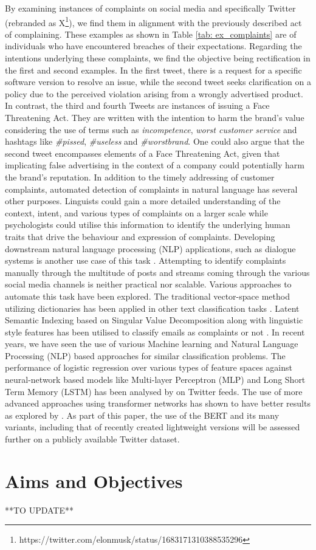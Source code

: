 By examining instances of complaints on social media and specifically Twitter (rebranded as X\footnote{https://twitter.com/elonmusk/status/1683171310388535296}), we find them in alignment with the previously described act of complaining. These examples as shown in Table \ref{tab: ex_complaints} are of individuals who have encountered breaches of their expectations. Regarding the intentions underlying these complaints, we find the objective being rectification in the first and second examples. In the first tweet, there is a request for a specific software version to resolve an issue, while the second tweet seeks clarification on a policy due to the perceived violation arising from a wrongly advertised product. In contrast, the third and fourth Tweets are instances of issuing a Face Threatening Act. They are written with the intention to harm the brand's value considering the use of terms such as \textit{incompetence}, \textit{worst customer service} and hashtags like \textit{\#pissed}, \textit{\#useless} and \textit{\#worstbrand}. One could also argue that the second tweet encompasses elements of a Face Threatening Act, given that implicating false advertising in the context of a company could potentially harm the brand's reputation.
\newline \newline
In addition to the timely addressing of customer complaints, automated detection of complaints in natural language has several other purposes. Linguists could gain a more detailed understanding of the context, intent, and various types of complaints on a larger scale while psychologists could utilise this information to identify the underlying human traits that drive the behaviour and expression of complaints. Developing downstream natural language processing (NLP) applications, such as dialogue systems is another use case of this task \cite{preotiuc-pietro_automatically_2019}.
\newline \newline
Attempting to identify complaints manually through the multitude of posts and streams coming through the various social media channels is neither practical nor scalable. Various approaches to automate this task have been explored. The traditional vector-space method utilizing dictionaries has been applied in other text classification tasks \cite{liang_dictionary-based_2006}. Latent Semantic Indexing based on Singular Value Decomposition along with linguistic style features has been utilised to classify emails as complaints or not \cite{coussement_improving_2008}. In recent years, we have seen the use of various Machine learning and Natural Language Processing (NLP) based approaches for similar classification problems. The performance of logistic regression over various types of feature spaces against neural-network based models like Multi-layer Perceptron (MLP) and Long Short Term Memory (LSTM) has been analysed by \cite{preotiuc-pietro_automatically_2019} on Twitter feeds. The use of more advanced approaches using transformer networks has shown to have better results as explored by \cite{jin_complaint_2020}. As part of this paper, the use of the BERT and its many variants, including that of recently created lightweight versions will be assessed further on a publicly available Twitter dataset.

\section{Aims and Objectives}

**TO UPDATE**

